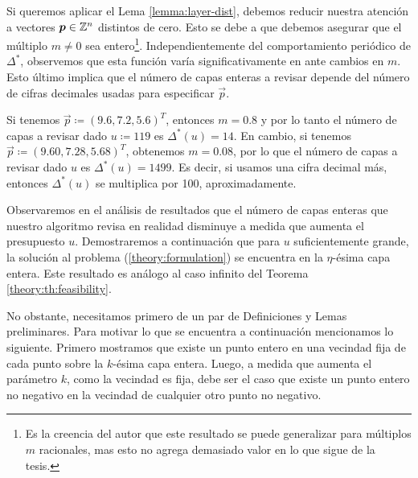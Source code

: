 Si queremos aplicar el Lema \ref{lemma:layer-dist}, debemos reducir nuestra atención a vectores
$\boldsymbol{p} \in \mathbb{Z}^n$ distintos de cero. Esto se debe a que debemos asegurar que el múltiplo $m \neq 0$
sea entero\footnote{Es la creencia del autor que este resultado se puede generalizar para múltiplos
$m$ racionales, mas esto no agrega demasiado valor en lo que sigue de la tesis.}. Independientemente
del comportamiento periódico de $\Delta^*$, observemos que esta función varía significativamente en
ante cambios en $m$. Esto último implica que el número de capas enteras a revisar depende del número
de cifras decimales usadas para especificar $\vec{p}$.

\begin{example}
	Si tenemos $\vec{p} \coloneq (9.6, 7.2, 5.6)^T$, entonces $m = 0.8$ y por lo tanto el número de
	capas a revisar dado $u \coloneq 119$ es $\Delta^*(u) = 14$. En cambio, si tenemos $\vec{p} \coloneq
	(9.60, 7.28, 5.68)^T$, obtenemos $m = 0.08$, por lo que el número de capas a revisar dado $u$ es
	$\Delta^*(u) = 1499$. Es decir, si usamos una cifra decimal más, entonces $\Delta^*(u)$ se
	multiplica por 100, aproximadamente.
\end{example}


Observaremos en el análisis de resultados que el número de capas enteras que nuestro algoritmo
revisa en realidad disminuye a medida que aumenta el presupuesto $u$. Demostraremos a continuación
que para $u$ suficientemente grande, la solución al problema (\ref{theory:formulation}) se encuentra
en la $\eta$-ésima capa entera. Este resultado es análogo al caso infinito del Teorema
\ref{theory:th:feasibility}.

No obstante, necesitamos primero de un par de Definiciones y Lemas preliminares. Para motivar lo que
se encuentra a continuación mencionamos lo siguiente. Primero mostramos que existe un punto entero
en una vecindad fija de cada punto sobre la $k$-ésima capa entera. Luego, a medida que aumenta el
parámetro $k$, como la vecindad es fija, debe ser el caso que existe un punto entero no negativo en
la vecindad de cualquier otro punto no negativo.

